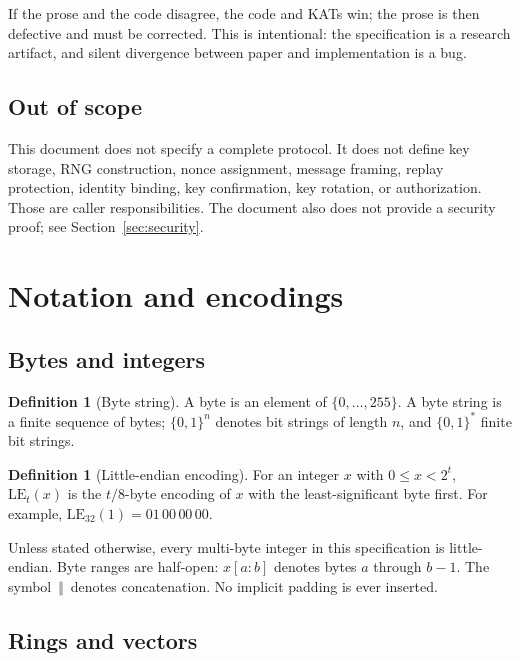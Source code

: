 \documentclass[11pt,a4paper]{article}
\theoremstyle{plain}
\theoremstyle{definition}
\newtheorem{definition}[theorem]{Definition}
\theoremstyle{remark}
\newcommand{\concat}{\,\Vert\,}
\newcommand{\bits}{\{0,1\}}
\begin{document}
If the prose and the code disagree, the code and KATs win; the prose is
then defective and must be corrected.  This is intentional: the
specification is a research artifact, and silent divergence between
paper and implementation is a bug.

\subsection{Out of scope}

This document does not specify a complete protocol.  It does not define
key storage, RNG construction, nonce assignment, message framing, replay
protection, identity binding, key confirmation, key rotation, or
authorization.  Those are caller responsibilities.  The document also
does not provide a security proof; see Section~\ref{sec:security}.

\section{Notation and encodings}
\label{sec:notation}

\subsection{Bytes and integers}

\begin{definition}[Byte string]
A byte is an element of $\{0,\ldots,255\}$.  A byte string is a finite
sequence of bytes; $\bits^n$ denotes bit strings of length $n$, and
$\bits^*$ finite bit strings.
\end{definition}

\begin{definition}[Little-endian encoding]
For an integer $x$ with $0\le x<2^t$, $\mathrm{LE}_t(x)$ is the
$t/8$-byte encoding of $x$ with the least-significant byte first.  For
example, $\mathrm{LE}_{32}(1)=01\,00\,00\,00$.
\end{definition}

Unless stated otherwise, every multi-byte integer in this specification
is little-endian.  Byte ranges are half-open: $x[a:b]$ denotes bytes
$a$ through $b-1$.  The symbol $\concat$ denotes concatenation.  No
implicit padding is ever inserted.

\subsection{Rings and vectors}
\end{document}
